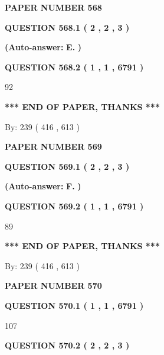 \documentclass{ctexart}
\begin{document}
   
\newpage 
\setcounter{page}{ 
   568001 } 
   
   
 {\textbf{ \Large{ PAPER NUMBER  568  }}}
   
   
   
   
  
  
{\textbf{\large{QUESTION
568.1 
 ( 2 , 2 , 3 )
}}}
 
 
{\textbf{(Auto-answer:}}
{\textbf{\large{
E.}}}
{\textbf{)}}
 
 
  
  
{\textbf{\large{QUESTION
568.2 
 ( 1 , 1 , 6791 )
}}}

92
   
   
   
   
\vspace{1.0in} 
{\textbf{\large{ *** END OF PAPER, THANKS *** }}} 
   
   
\hspace{1.0in} By: 
 239 ( 416 ,  613 )
   
   
   
   
\newpage 
\setcounter{page}{ 
   569001 } 
   
   
 {\textbf{ \Large{ PAPER NUMBER  569  }}}
   
   
   
   
  
  
{\textbf{\large{QUESTION
569.1 
 ( 2 , 2 , 3 )
}}}
 
 
{\textbf{(Auto-answer:}}
{\textbf{\large{
F.}}}
{\textbf{)}}
 
 
  
  
{\textbf{\large{QUESTION
569.2 
 ( 1 , 1 , 6791 )
}}}

89
   
   
   
   
\vspace{1.0in} 
{\textbf{\large{ *** END OF PAPER, THANKS *** }}} 
   
   
\hspace{1.0in} By: 
 239 ( 416 ,  613 )
   
   
   
   
\newpage 
\setcounter{page}{ 
   570001 } 
   
   
 {\textbf{ \Large{ PAPER NUMBER  570  }}}
   
   
   
   
  
  
{\textbf{\large{QUESTION
570.1 
 ( 1 , 1 , 6791 )
}}}

107
  
  
{\textbf{\large{QUESTION
570.2 
 ( 2 , 2 , 3 )
}}}
 
\end{document}
